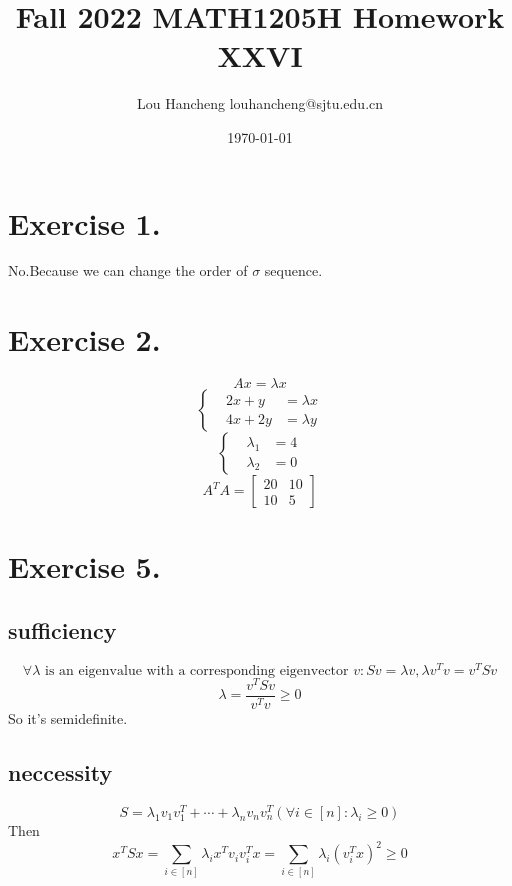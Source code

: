 \documentclass[12pt, a4paper, oneside]{article}
\title{Fall 2022 MATH1205H Homework XXVI}
\author{Lou Hancheng \quad louhancheng@sjtu.edu.cn}
\date{\today}
\begin{document}
    \maketitle
    \section*{Exercise 1.}
        No.Because we can change the order of $\sigma$ sequence.
    \section*{Exercise 2.}
        $$
            Ax=\lambda x
        $$
        $$
            \left\{\begin{aligned}
                & 2x + y &= \lambda x\\
                & 4x + 2y &= \lambda y
            \end{aligned}\right.
        $$
        $$
            \left\{\begin{aligned}
                & \lambda_1 &= 4\\
                & \lambda_2 &= 0
            \end{aligned}\right.
        $$
        $$
            A^TA=\begin{bmatrix}
                20 & 10\\
                10 & 5
            \end{bmatrix}
        $$
    \section*{Exercise 5.}
        \subsection*{sufficiency}
            $$
                \forall \lambda\text{ is an eigenvalue with a corresponding eigenvector }v:Sv=\lambda v, \lambda v^Tv=v^TSv
            $$
            $$
                \lambda = \frac{v^TSv}{v^Tv}\geq 0
            $$
            So it's semidefinite.
        \subsection*{neccessity}
            $$
                S=\lambda_1v_1v_1^T+\cdots+\lambda_nv_nv_n^T (\forall i\in [n]:\lambda_i\geq 0)
            $$
            Then
            $$
                x^TSx=\sum_{i\in[n]}\lambda_ix^Tv_iv_i^Tx=\sum_{i\in[n]}\lambda_i(v_i^Tx)^2\geq 0
            $$
\end{document}
